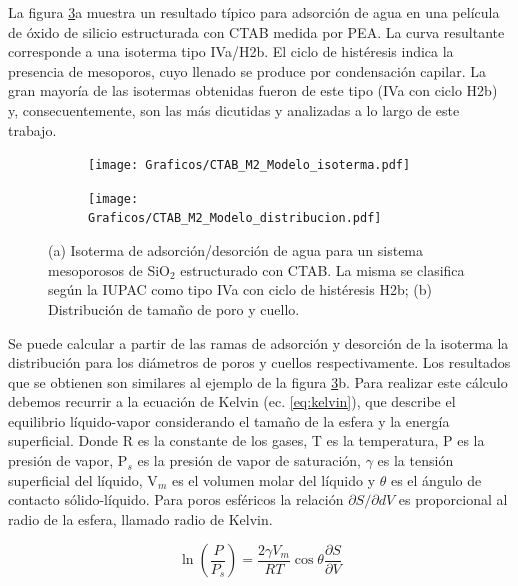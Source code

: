 		La figura \ref{fig:pea_ej}a muestra un resultado típico para adsorción de agua en una película de óxido de silicio estructurada con CTAB medida por PEA. La curva resultante corresponde a una isoterma tipo IVa/H2b. El ciclo de histéresis indica la presencia de mesoporos, cuyo llenado se produce por condensación capilar. \cite{Gregg1967}La gran mayoría de las isotermas obtenidas fueron de este tipo (IVa con ciclo H2b) y, consecuentemente, son las más dicutidas y analizadas a lo largo de este trabajo. 

			\begin{figure}[!ht]
		     	  		\begin{subfigure}[t]{0.491\textwidth}
		     	  		\texttt{[image: Graficos/CTAB\_M2\_Modelo\_isoterma.pdf]}
						\label{fig:pea_ej1}
						\end{subfigure}
						\begin{subfigure}[t]{0.495\textwidth}
		     	  		\texttt{[image: Graficos/CTAB\_M2\_Modelo\_distribucion.pdf]}
						\label{fig:pea_ej2}
						\end{subfigure}
						\vspace*{-0.6cm}
						\caption[Isoterma de adsorción/desorción tipo IVa, H2b.]{(a) Isoterma de adsorción/desorción de agua para un sistema mesoporosos de SiO$_2$ estructurado con CTAB. La misma se clasifica según la IUPAC como tipo IVa con ciclo de histéresis H2b; (b) Distribución de tamaño de poro y cuello.}
						\label{fig:pea_ej}
						\end{figure}			
		\vspace{0.3cm}				
		Se puede calcular a partir de las ramas de adsorción y desorción de la isoterma la distribución para los diámetros de poros y cuellos respectivamente. Los resultados que se obtienen son similares al ejemplo de la figura \ref{fig:pea_ej}b. Para realizar este cálculo debemos recurrir a la ecuación de Kelvin (ec. \ref{eq:kelvin}), que describe el equilibrio líquido-vapor considerando el tamaño de la esfera y la energía superficial. Donde R es la constante de los gases, T es la temperatura, P es la presión de vapor, P$_s$ es la presión de vapor de saturación, $\gamma$ es la tensión superficial del líquido, V$_m$ es el volumen molar del líquido y $\theta$ es el ángulo de contacto sólido-líquido. \cite{Baklanov2000,Boissiere2005,Sing1985} Para poros esféricos la relación $\partial S/ \partial dV$ es proporcional al radio de la esfera, llamado radio de Kelvin.\cite{FernandezPrini2005}
		
			\begin{equation}
			  	 \ln \left(\frac{P}{P_s}\right)=\frac{2\gamma V_m}{RT} \cos{\theta}\frac{\partial S}{\partial V}
			     \label{eq:kelvin}
			 	 \end{equation}					
	
